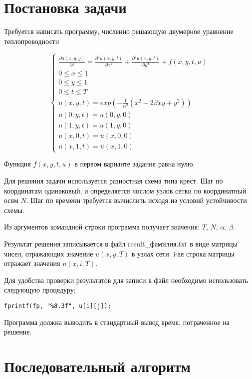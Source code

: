 \documentclass[11pt, oneside, a4paper]{article}
\begin{document}
\thispagestyle{empty}

\section{Постановка задачи}

Требуется написать программу, численно решающую двумерное уравнение теплопроводности

\begin{displaymath}
\left\{\begin{array}{l}
\frac{\partial u(x, y, y)}{\partial t} = \frac{\partial^2 u(x, y, t)}{\partial x^2} + \frac{\partial^2 u(x, y, t)}{\partial y^2} + f(x, y, t, u) \\
0 \le x \le 1 \\
0 \le y \le 1 \\
0 \le t \le T \\
u(x, y, t) = exp(-\frac{1}{\alpha^2}(x^2 - 2 \beta x y + y^2)) \\
u(0, y, t) = u(0, y, 0) \\
u(1, y, t) = u(1, y, 0) \\
u(x, 0, t) = u(x, 0, 0) \\
u(x, 1, t) = u(x, 1, 0)
\end{array}\right.
\end{displaymath}

Функция $f(x, y, t, u)$ в первом варианте задания равна нулю.

Для решения задачи используется разностная схема типа крест. Шаг по координатам одинаковый, и определяется числом узлов сетки по координатный осям $N$. Шаг по времени требуется вычислить исходя из условий устойчивости схемы.

Из аргументов командной строки программа получает значения: $T$, $N$, $\alpha$, $\beta$.

Результат решения записывается в файл result\_фамилия.txt в виде матрицы чисел, отражающих значение $u(x, y, T)$ в узлах сети. i-ая строка матрицы отражает значения $u(x, i, T)$.

Для удобства проверки результатов для записи в файл необходимо использовать следующую процедуру:

\begin{lstlisting}
fprintf(fp, "%8.3f", u[i][j]);
\end{lstlisting}

Программа должна выводить в стандартный вывод время, потраченное на решение.

\section{Последовательный алгоритм}
\end{document}

